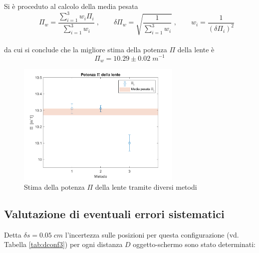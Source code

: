 \documentclass[11pt,a4paper]{article}
\begin{document}
Si è proceduto al calcolo della media pesata
\begin{equation}
    \qquad{\Pi_w = \frac{\sum_{i=1}^{3} w_i \Pi_i}{\sum_{i=1}^{3} w_i }} \; ,
    \qquad{\delta \Pi_w = \sqrt{\frac{1}{\sum_{i=1}^{3} w_i}}}\; ,
    \qquad{w_i = \frac{1}{(\delta \Pi_i)^2}}
    \label{eq:media-pesata-potenza}
\end{equation}
\\
da cui si conclude che la migliore stima della potenza $\Pi$ della lente è
\\
\begin{equation}
    \Pi_w = 10.29 \pm 0.02 \; m^{-1}
    \label{eq:potenza-media-pesata-value}
\end{equation}

\begin{figure}[H]
    \centering
    \includegraphics[width=0.7\textwidth]{potenza-lente.png}
    \caption{Stima della potenza $\Pi$ della lente tramite diversi metodi}
    \label{fig:potenza}
\end{figure}


\subsection{Valutazione di eventuali errori sistematici}
Detta $\delta s = 0.05 \; cm$ l'incertezza sulle posizioni per questa configurazione (vd. Tabella \ref{tab:dconf3}) per ogni distanza $D$ oggetto-schermo sono stato determinati: 
\end{document}
